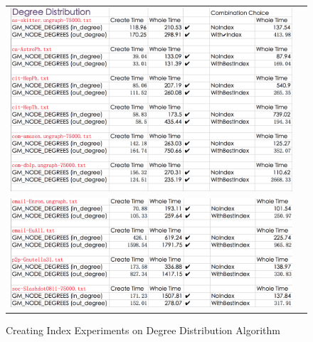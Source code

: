 \begin{figure}[H]
\begin{center}
\begin{tabular}{cc}
     \includegraphics[width=1.0\textwidth]{FIG/DD1.png} \\
     \includegraphics[width=1.0\textwidth]{FIG/DD2.png} \\
\end{tabular}
\caption{Creating Index Experiments on Degree Distribution Algorithm}
\end{center}
\end{figure}

